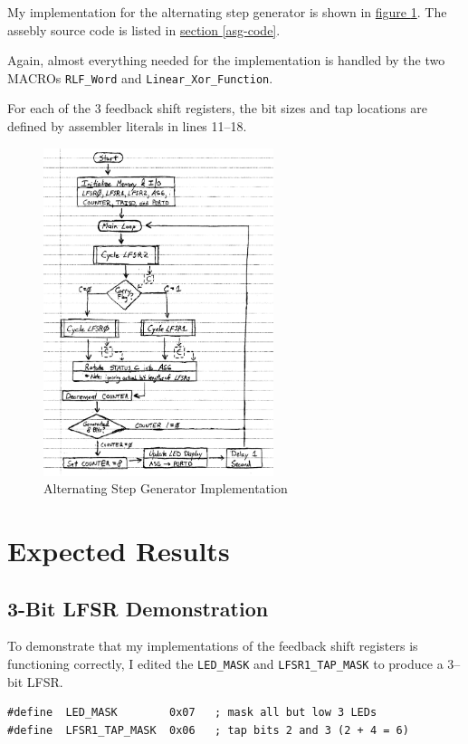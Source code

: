 \documentclass[11pt]{article}
\begin{document}
My implementation for the alternating step generator is shown in
\hyperref[alternating-step-generator-flowchart]{figure \ref{alternating-step-generator-flowchart}}.
The assebly source code is listed in \hyperref[asg-code]{section \ref{asg-code}}.

Again, almost everything needed for the implementation is handled by the two
MACROs \texttt{RLF\_Word} and \texttt{Linear\_Xor\_Function}.

For each of the 3 feedback shift registers, the bit sizes and tap locations
are defined by assembler literals in lines 11--18.

\begin{figure}
	\centering
	\includegraphics[width=0.6\textwidth]{Figures/alternating-step-generator-flowchart.pdf}
	\caption{Alternating Step Generator Implementation}
	\label{alternating-step-generator-flowchart}
\end{figure}

\pagebreak
\section{Expected Results}

\subsection{3-Bit LFSR Demonstration}

To demonstrate that my implementations of the feedback shift registers
is functioning correctly, I edited the \texttt{LED\_MASK} and
\texttt{LFSR1\_TAP\_MASK} to produce a 3--bit LFSR.
\begin{verbatim}
#define  LED_MASK        0x07   ; mask all but low 3 LEDs
#define  LFSR1_TAP_MASK  0x06   ; tap bits 2 and 3 (2 + 4 = 6)
\end{verbatim}
\end{document}
